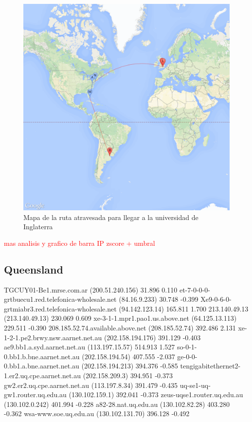 \begin{figure}[H]
	\begin{center}
		  \includegraphics[scale=0.4]{../results/maps/Oxford.png}
		  \caption{Mapa de la ruta atravesada para llegar a la universidad de Inglaterra}
	\end{center}
\end{figure}

\textcolor{red}{mas analisis y grafico de barra IP zscore + umbral}

\subsection{Queensland}

TGCUY01-Be1.mrse.com.ar	(200.51.240.156)	31.896	0.110
et-7-0-0-0-grtbuecu1.red.telefonica-wholesale.net	(84.16.9.233)	30.748	-0.399
Xe9-0-6-0-grtmiabr3.red.telefonica-wholesale.net	(94.142.123.14)	165.811	1.700
213.140.49.13	(213.140.49.13)	230.069	0.609
xe-3-1-1.mpr1.pao1.us.above.net	(64.125.13.113)	229.511	-0.390
208.185.52.74.available.above.net	(208.185.52.74)	392.486	2.131
xe-1-2-1.pe2.brwy.nsw.aarnet.net.au	(202.158.194.176)	391.129	-0.403
ae9.bb1.a.syd.aarnet.net.au	(113.197.15.57)	514.913	1.527
so-0-1-0.bb1.b.bne.aarnet.net.au	(202.158.194.54)	407.555	-2.037
ge-0-0-0.bb1.a.bne.aarnet.net.au	(202.158.194.213)	394.376	-0.585
tengigabitethernet2-1.er2.uq.cpe.aarnet.net.au	(202.158.209.3)	394.951	-0.373
gw2.er2.uq.cpe.aarnet.net.au	(113.197.8.34)	391.479	-0.435
uq-se1-uq-gw1.router.uq.edu.au	(130.102.159.1)	392.041	-0.373
zeus-uqse1.router.uq.edu.au	(130.102.0.242)	401.994	-0.228
a82-28.nat.uq.edu.au	(130.102.82.28)	403.280	-0.362
wsa-www.soe.uq.edu.au	(130.102.131.70)	396.128	-0.492

